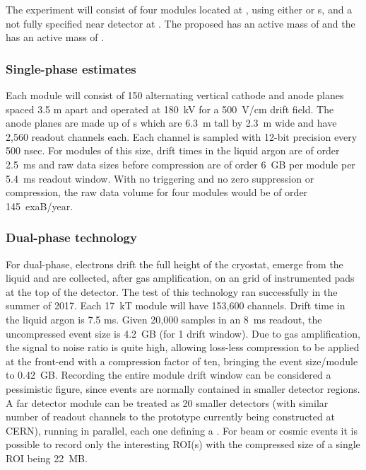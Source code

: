 The  experiment will consist of four \larmass {} modules located at  \surf, using either \single or \dual \lartpc{}s, and a not fully specified near detector at \fnal. The proposed   has an active mass of \spactivelarmass and the  has an active mass of \dpactivelarmass{}.

\subsubsection{Single-phase estimates}
 Each    module will consist of 
150 alternating vertical cathode and anode planes  spaced 3.5 m apart and operated at 180~kV for a 500~V/cm drift field.  The anode planes are made up of s which are 6.3~m tall by 2.3~m wide and have 2,560 readout channels each. Each channel is sampled with 12-bit precision every 500 nsec. %
For modules of this size, drift times in the liquid argon are of order 2.5~ms and raw data sizes before compression are of order 6~GB per module per 5.4~ms readout window.  With no triggering and no zero suppression or compression, the raw data volume for four modules would be of order 145~exaB/year. 




\subsubsection{Dual-phase technology}

For dual-phase, electrons drift the full height of the cryostat, emerge from the liquid and are collected,  after gas amplification, on an grid of instrumented pads at the top of the detector.  The  test of this technology ran successfully in the summer of 2017\cite{Murphy:20170516}. 
Each 17~kT module will have 153,600 channels. Drift time in the liquid argon is 7.5 ms. Given 20,000 samples in an 8~ms readout, the uncompressed event size is 4.2~GB (for 1 drift window).  Due to gas amplification, the signal to noise ratio is quite high, allowing loss-less compression to be applied at the front-end  with a compression factor of ten, bringing the event size/module to 0.42~GB. Recording the entire module drift window can be considered a pessimistic figure, since events are normally contained in smaller detector regions. A  far detector module can be treated as 20 smaller  detectors (with similar number  of readout channels to the prototype currently being constructed at CERN), running in parallel, each one defining a . For beam or cosmic events it is possible to record only the interesting ROI(s) with the compressed size of a single ROI being 22~MB.


